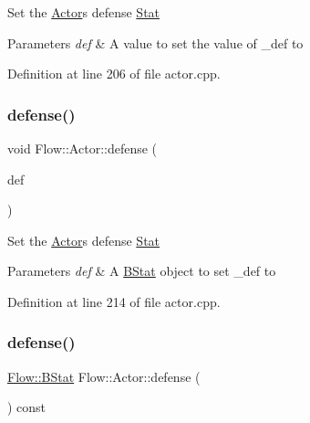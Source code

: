Set the \hyperlink{class_flow_1_1_actor}{Actor}\textquotesingle{}s defense \hyperlink{class_flow_1_1_stat}{Stat} 
\begin{DoxyParams}{Parameters}
{\em def} & A value to set the value of \+\_\+def to \\
\hline
\end{DoxyParams}


Definition at line 206 of file actor.\+cpp.

\hypertarget{class_flow_1_1_actor_aba8a18fe7673cbd965d195e128067351}{}\label{class_flow_1_1_actor_aba8a18fe7673cbd965d195e128067351} 
\subsubsection{\texorpdfstring{defense()}{defense()}\hspace{0.1cm}{\footnotesize\ttfamily [2/3]}}
{\footnotesize\ttfamily void Flow\+::\+Actor\+::defense (\begin{DoxyParamCaption}\item[{const \hyperlink{class_flow_1_1_b_stat}{B\+Stat} \&}]{def }\end{DoxyParamCaption})}

Set the \hyperlink{class_flow_1_1_actor}{Actor}\textquotesingle{}s defense \hyperlink{class_flow_1_1_stat}{Stat} 
\begin{DoxyParams}{Parameters}
{\em def} & A \hyperlink{class_flow_1_1_b_stat}{B\+Stat} object to set \+\_\+def to \\
\hline
\end{DoxyParams}


Definition at line 214 of file actor.\+cpp.

\hypertarget{class_flow_1_1_actor_a70095802b129f53a2467e919e5e14c9b}{}\label{class_flow_1_1_actor_a70095802b129f53a2467e919e5e14c9b} 
\subsubsection{\texorpdfstring{defense()}{defense()}\hspace{0.1cm}{\footnotesize\ttfamily [3/3]}}
{\footnotesize\ttfamily \hyperlink{class_flow_1_1_b_stat}{Flow\+::\+B\+Stat} Flow\+::\+Actor\+::defense (\begin{DoxyParamCaption}{ }\end{DoxyParamCaption}) const}

